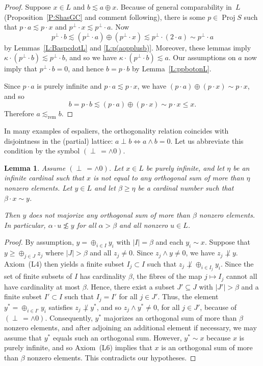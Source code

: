 \documentclass[psamsfonts,reqno]{memo-l}
\theoremstyle{plain}
\newtheorem{lemma}{Lemma}[section]
\theoremstyle{definition}
\theoremstyle{remark}
\numberwithin{equation}{section}
\newcommand{\srem}{\lesssim_{\mathrm{rem}}}
\DeclareMathOperator{\BB}{Proj}
\begin{document}
\begin{proof} Suppose $x\in L$ and $b\lesssim a\oplus x$. Because
of general comparability in~$L$ (Proposition~\ref{P:ShasGC} and comment
following), there is some $p\in\BB S$\index{pzzroj@$\BB{S}$} such that
$p\cdot a\lesssim p\cdot x$ and $p^\perp\cdot x\lesssim p^\perp\cdot a$. Now
   \[
   p^\perp\cdot b\lesssim (p^\perp\cdot a)\oplus (p^\perp\cdot x)
   \lesssim p^\perp\cdot(2\cdot a)\sim p^\perp\cdot a
   \]
by Lemmas~\ref{L:BaspcdotL} and \ref{L:p(aopplusb)}. Moreover, these lemmas
imply $\kappa\cdot(p^\perp\cdot b)\lesssim p^\perp\cdot b$, and so we
have $\kappa\cdot(p^\perp\cdot b) \lesssim a$. Our assumptions on
$a$ now imply that $p^\perp\cdot b=0$, and hence $b=p\cdot b$ by
Lemma~\ref{L:ppbotonL}.

Since $p\cdot a$ is purely infinite and $p\cdot a\lesssim p\cdot x$, we have
$(p\cdot a)\oplus (p\cdot x) \sim p\cdot x$, and so
   \[
   b= p\cdot b\lesssim (p\cdot a)\oplus (p\cdot x) \sim p\cdot x \leq x.
   \]
Therefore $a\srem b$.
\end{proof}

In many examples of espaliers, the orthogonality relation
coincides with disjointness in the (partial) lattice:
$a\perp b\Longleftrightarrow a\wedge b=0$. Let us abbreviate this condition
by the symbol $(\perp\,=\wedge0)$.

\begin{lemma}\label{L:orthocount}
Assume $(\perp\,=\wedge0)$. Let $x\in L$ be purely infinite, and
let $\eta$ be an infinite cardinal such that $x$ is not equal to
any orthogonal sum of more than $\eta$ nonzero elements. Let $y\in L$
and let $\beta\geq\eta$ be a cardinal number such that $\beta\cdot x\sim y$.

Then $y$ does not majorize any orthogonal sum of more than
$\beta$ nonzero elements. In particular, $\alpha\cdot
u\not\lesssim y$ for all $\alpha>\beta$ and all nonzero $u\in L$.
\end{lemma}

\begin{proof} By assumption, $y= \oplus_{i\in I} y_i$ with
$|I|=\beta$ and each $y_i\sim x$. Suppose that $y\geq\oplus_{j\in
J} z_j$ where $|J|>\beta$ and all $z_j\ne 0$. Since $z_j\wedge
y\ne 0$, we have $z_j\not\perp y$. Axiom~(L4) then yields a finite subset
$I_j\subset I$ such that $z_j\not\perp \oplus_{i\in I_j} y_i$. Since the set
of finite subsets of $I$ has cardinality $\beta$, the fibres of the map
$j\mapsto I_j$ cannot all have cardinality at most $\beta$. Hence,
there exist a subset $J'\subseteq J$ with $|J'|>\beta$ and a
finite subset $I'\subset I$ such that $I_j=I'$ for all $j\in J'$.
Thus, the element $y^*= \oplus_{i\in I'} y_i$ satisfies
$z_j\not\perp y^*$, and so
$z_j\wedge y^* \ne 0$, for all $j\in J'$,  because of
$(\perp\,=\wedge0)$. Consequently, $y^*$ majorizes an orthogonal
sum of more than $\beta$ nonzero elements, and after adjoining
an additional element if necessary, we may assume that
$y^*$ equals such an orthogonal sum. However, $y^*\sim x$ because
$x$ is purely infinite, and so Axiom~(L6) implies that $x$ is an
orthogonal sum of more than $\beta$ nonzero elements. This
contradicts our hypotheses. \end{proof}
\end{document}
